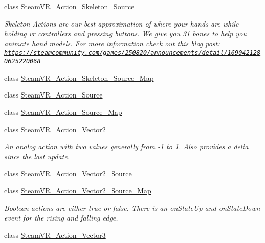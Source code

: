 \begin{DoxyCompactItemize}
class \mbox{\hyperlink{class_valve_1_1_v_r_1_1_steam_v_r___action___skeleton___source}{Steam\+V\+R\+\_\+\+Action\+\_\+\+Skeleton\+\_\+\+Source}}
\begin{DoxyCompactList}\small\item\em Skeleton Actions are our best approximation of where your hands are while holding vr controllers and pressing buttons. We give you 31 bones to help you animate hand models. For more information check out this blog post\+: \href{https://steamcommunity.com/games/250820/announcements/detail/1690421280625220068}{\texttt{ https\+://steamcommunity.\+com/games/250820/announcements/detail/1690421280625220068}} \end{DoxyCompactList}\item 
class \mbox{\hyperlink{class_valve_1_1_v_r_1_1_steam_v_r___action___skeleton___source___map}{Steam\+V\+R\+\_\+\+Action\+\_\+\+Skeleton\+\_\+\+Source\+\_\+\+Map}}
\item 
class \mbox{\hyperlink{class_valve_1_1_v_r_1_1_steam_v_r___action___source}{Steam\+V\+R\+\_\+\+Action\+\_\+\+Source}}
\item 
class \mbox{\hyperlink{class_valve_1_1_v_r_1_1_steam_v_r___action___source___map}{Steam\+V\+R\+\_\+\+Action\+\_\+\+Source\+\_\+\+Map}}
\item 
class \mbox{\hyperlink{class_valve_1_1_v_r_1_1_steam_v_r___action___vector2}{Steam\+V\+R\+\_\+\+Action\+\_\+\+Vector2}}
\begin{DoxyCompactList}\small\item\em An analog action with two values generally from -\/1 to 1. Also provides a delta since the last update. \end{DoxyCompactList}\item 
class \mbox{\hyperlink{class_valve_1_1_v_r_1_1_steam_v_r___action___vector2___source}{Steam\+V\+R\+\_\+\+Action\+\_\+\+Vector2\+\_\+\+Source}}
\item 
class \mbox{\hyperlink{class_valve_1_1_v_r_1_1_steam_v_r___action___vector2___source___map}{Steam\+V\+R\+\_\+\+Action\+\_\+\+Vector2\+\_\+\+Source\+\_\+\+Map}}
\begin{DoxyCompactList}\small\item\em Boolean actions are either true or false. There is an on\+State\+Up and on\+State\+Down event for the rising and falling edge. \end{DoxyCompactList}\item 
class \mbox{\hyperlink{class_valve_1_1_v_r_1_1_steam_v_r___action___vector3}{Steam\+V\+R\+\_\+\+Action\+\_\+\+Vector3}}

\end{DoxyCompactItemize}
